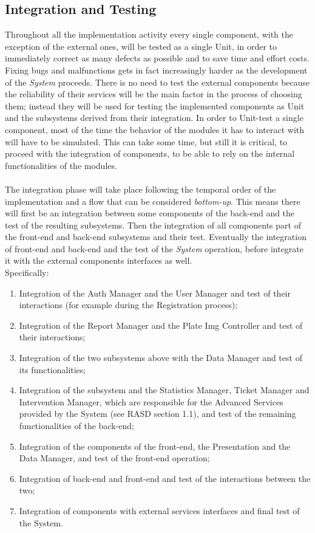 \documentclass{article}
\begin{document}
	\subsection{Integration and Testing}
	Throughout all the implementation activity every single component, with the exception of the external ones, will be tested as a single Unit, in order to immediately correct as many defects as possible and to save time and effort costs. Fixing bugs and malfunctions gets in fact increasingly harder as the development of the {\it System} proceeds. There is no need to test the external components because the reliability of their services will be the main factor in the process of choosing them; instead they will be used for testing the implemented components as Unit and the subsystems derived from their integration. 
In order to Unit-test a single component, most of the time the behavior of the modules it has to interact with will have to be simulated. This can take some time, but still it is critical, to proceed with the integration of components, to be able to rely on the internal functionalities of the modules. \\ \\
The integration phase will take place following the temporal order of the implementation and a flow that can be considered {\it bottom-up}. This means there will first be an integration between some components of the back-end and the test of the resulting subsystems. Then the integration of all components part of the front-end and back-end subsystems and their test. Eventually the integration of front-end and back-end and the test of the {\it System} operation, before integrate it with the external components interfaces as well. \\
Specifically: \\
\begin{enumerate}
		\item Integration of the Auth Manager and the User Manager and test of their interactions (for example during the Registration process);
		\item Integration of the Report Manager and the Plate Img Controller and test of their interactions;
		\item Integration of the two subsystems above with the Data Manager and test of its functionalities;
		\item Integration of the subsystem and the Statistics Manager, Ticket Manager and Intervention Manager, which are responsible for the Advanced Services provided by the System (see RASD section 1.1), and test of the remaining functionalities of the back-end;
		\item Integration of the components of the front-end, the Presentation and the Data Manager, and test of the front-end operation;
		\item Integration of back-end and front-end and test of the interactions between the two;
		\item Integration of components with external services interfaces and final test of the System.
	\end{enumerate}
\end{document}
